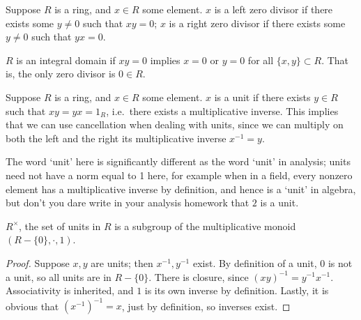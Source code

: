 \begin{definition}
    Suppose \(R\) is a ring, and \(x \in R\) some element.
    \(x\) is a left zero divisor if there exists some \(y \neq 0\)
    such that \(xy = 0\);
    \(x\) is a right zero divisor if there exists some \(y \neq 0\)
    such that \(yx = 0\).
\end{definition}
\begin{definition}
    \(R\) is an integral domain if \(xy = 0\)
    implies \(x = 0\) or \(y = 0\) for all \(\{x,y\} \subset R\).
    That is, the only zero divisor is \(0 \in R\).
\end{definition}

\begin{definition}
    Suppose \(R\) is a ring, and \(x \in R\) some element.
    \(x\) is a unit if there exists \(y \in R\)
    such that \(xy = yx = 1_R\),
    i.e.\ there exists a multiplicative inverse.
    This implies that we can use cancellation when dealing with units,
    since we can multiply on both the left and the right
    its multiplicative inverse \(x^{-1} = y\).
\end{definition}
\begin{remark}
    The word `unit' here is significantly different
    as the word `unit' in analysis;
    units need not have a norm equal to 1 here,
    for example when in a field,
    every nonzero element has a multiplicative inverse by definition,
    and hence is a `unit' in algebra,
    but don't you dare write in your analysis homework
    that \(2\) is a unit.
\end{remark}
\begin{proposition}\label{prop:ring-unit-subgroup}
    \(R^\times\), the set of units in \(R\) is a subgroup
    of the multiplicative monoid \((R - \{0\},\cdot,1)\).
\end{proposition}
\begin{proof}
    Suppose \(x,y\) are units; then \(x^{-1},y^{-1}\) exist.
    By definition of a unit, \(0\) is not a unit,
    so all units are in \(R - \{0\}\).
    There is closure, since \({(xy)}^{-1} = y^{-1}x^{-1}\).
    Associativity is inherited,
    and \(1\) is its own inverse by definition.
    Lastly, it is obvious that \({(x^{-1})}^{-1} = x\),
    just by definition, so inverses exist.
\end{proof}

